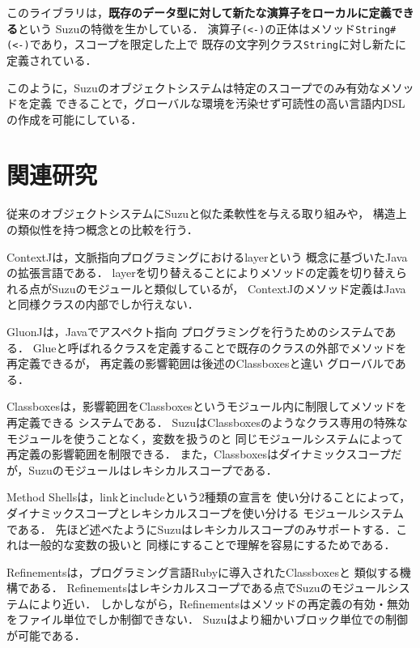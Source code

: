 \documentclass{ipsjprosym}
\begin{document}
このライブラリは，\textbf{既存のデータ型に対して新たな演算子をローカルに定義できる}という
Suzuの特徴を生かしている．
演算子\verb|(<-)|の正体はメソッド\verb|String#(<-)|であり，スコープを限定した上で
既存の文字列クラス\verb|String|に対し新たに定義されている．

このように，Suzuのオブジェクトシステムは特定のスコープでのみ有効なメソッドを定義
できることで，グローバルな環境を汚染せず可読性の高い言語内DSLの作成を可能にしている．

\section{関連研究}

従来のオブジェクトシステムにSuzuと似た柔軟性を与える取り組みや，
構造上の類似性を持つ概念との比較を行う．

ContextJ\cite{AppeltauerMalte:2011}は，文脈指向プログラミングにおけるlayerという
概念に基づいたJavaの拡張言語である．
layerを切り替えることによりメソッドの定義を切り替えられる点がSuzuのモジュールと類似しているが，
ContextJのメソッド定義はJavaと同様クラスの内部でしか行えない．

GluonJ\cite{Chiba:2010:MMC:1869459.1869503}は，Javaでアスペクト指向
プログラミングを行うためのシステムである．
Glueと呼ばれるクラスを定義することで既存のクラスの外部でメソッドを再定義できるが，
再定義の影響範囲は後述のClassboxes\cite{Bergel:2005:CCV:1646591.1646599}と違い
グローバルである．

Classboxesは，影響範囲をClassboxesというモジュール内に制限してメソッドを再定義できる
システムである．
SuzuはClassboxesのようなクラス専用の特殊なモジュールを使うことなく，変数を扱うのと
同じモジュールシステムによって再定義の影響範囲を制限できる．
また，Classboxesはダイナミックスコープだが，Suzuのモジュールはレキシカルスコープである．

Method Shells\cite{Takeshita:2014-07-14}は，linkとincludeという2種類の宣言を
使い分けることによって，ダイナミックスコープとレキシカルスコープを使い分ける
モジュールシステムである．
先ほど述べたようにSuzuはレキシカルスコープのみサポートする．これは一般的な変数の扱いと
同様にすることで理解を容易にするためである．

Refinements\cite{Maeda:2013}は，プログラミング言語Rubyに導入されたClassboxesと
類似する機構である．
Refinementsはレキシカルスコープである点でSuzuのモジュールシステムにより近い．
しかしながら，Refinementsはメソッドの再定義の有効・無効をファイル単位でしか制御できない．
Suzuはより細かいブロック単位での制御が可能である．
\end{document}

